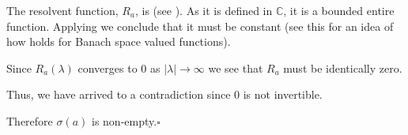 \documentclass[12pt]{article}
\begin{document}
\begin{itemize}
The resolvent function, $R_a$, is  (see ). As it is defined in $\mathbb{C}$, it is a bounded entire function. Applying  we conclude that it must be constant (see this  for an idea of how 
 holds for Banach space valued functions).

Since $R_a(\lambda)$ converges to $0$ as $|\lambda| \rightarrow \infty$ we see that $R_a$ must be identically zero.

Thus, we have arrived to a contradiction since $0$ is not invertible.

Therefore $\sigma(a)$ is non-empty.$\square$
\end{itemize}
\end{document}
